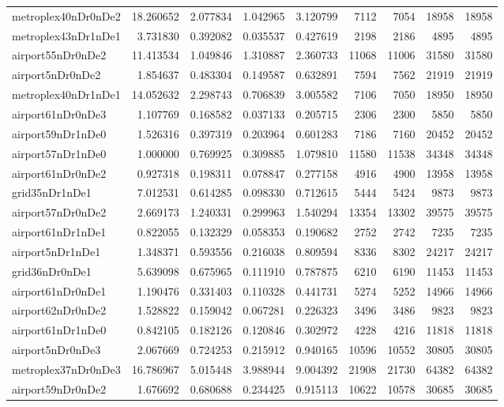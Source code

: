 \begin{longtable}{|l|r|r|r|r|r|r|r|r|}
metroplex40nDr0nDe2 & 18.260652 & 2.077834 & 1.042965 & 3.120799 & 7112 & 7054 & 18958 & 18958 \\
metroplex43nDr1nDe1 & 3.731830 & 0.392082 & 0.035537 & 0.427619 & 2198 & 2186 & 4895 & 4895 \\
airport55nDr0nDe2 & 11.413534 & 1.049846 & 1.310887 & 2.360733 & 11068 & 11006 & 31580 & 31580 \\
airport5nDr0nDe2 & 1.854637 & 0.483304 & 0.149587 & 0.632891 & 7594 & 7562 & 21919 & 21919 \\
metroplex40nDr1nDe1 & 14.052632 & 2.298743 & 0.706839 & 3.005582 & 7106 & 7050 & 18950 & 18950 \\
airport61nDr0nDe3 & 1.107769 & 0.168582 & 0.037133 & 0.205715 & 2306 & 2300 & 5850 & 5850 \\
airport59nDr1nDe0 & 1.526316 & 0.397319 & 0.203964 & 0.601283 & 7186 & 7160 & 20452 & 20452 \\
airport57nDr1nDe0 & 1.000000 & 0.769925 & 0.309885 & 1.079810 & 11580 & 11538 & 34348 & 34348 \\
airport61nDr0nDe2 & 0.927318 & 0.198311 & 0.078847 & 0.277158 & 4916 & 4900 & 13958 & 13958 \\
grid35nDr1nDe1 & 7.012531 & 0.614285 & 0.098330 & 0.712615 & 5444 & 5424 & 9873 & 9873 \\
airport57nDr0nDe2 & 2.669173 & 1.240331 & 0.299963 & 1.540294 & 13354 & 13302 & 39575 & 39575 \\
airport61nDr1nDe1 & 0.822055 & 0.132329 & 0.058353 & 0.190682 & 2752 & 2742 & 7235 & 7235 \\
airport5nDr1nDe1 & 1.348371 & 0.593556 & 0.216038 & 0.809594 & 8336 & 8302 & 24217 & 24217 \\
grid36nDr0nDe1 & 5.639098 & 0.675965 & 0.111910 & 0.787875 & 6210 & 6190 & 11453 & 11453 \\
airport61nDr0nDe1 & 1.190476 & 0.331403 & 0.110328 & 0.441731 & 5274 & 5252 & 14966 & 14966 \\
airport62nDr0nDe2 & 1.528822 & 0.159042 & 0.067281 & 0.226323 & 3496 & 3486 & 9823 & 9823 \\
airport61nDr1nDe0 & 0.842105 & 0.182126 & 0.120846 & 0.302972 & 4228 & 4216 & 11818 & 11818 \\
airport5nDr0nDe3 & 2.067669 & 0.724253 & 0.215912 & 0.940165 & 10596 & 10552 & 30805 & 30805 \\
metroplex37nDr0nDe3 & 16.786967 & 5.015448 & 3.988944 & 9.004392 & 21908 & 21730 & 64382 & 64382 \\
airport59nDr0nDe2 & 1.676692 & 0.680688 & 0.234425 & 0.915113 & 10622 & 10578 & 30685 & 30685 \\

\end{longtable}
